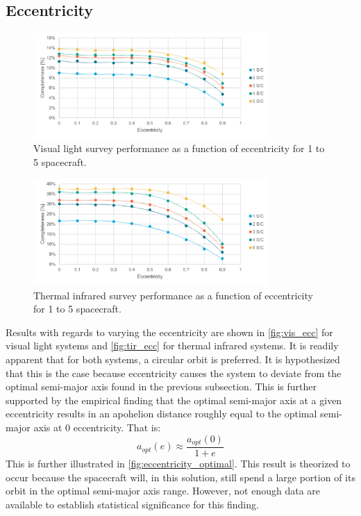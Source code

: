 \subsection{Eccentricity}
\begin{figure}[htbp]
 \centering
 \includegraphics[width=0.8\textwidth]{img/vis_ecc.pdf}
 \caption{Visual light survey performance as a function of eccentricity for 1 to 5 spacecraft.}
 \label{fig:vis_ecc}
\end{figure}

\begin{figure}[htbp]
 \centering
 \includegraphics[width=0.8\textwidth]{img/tir_ecc.pdf}
 \caption{Thermal infrared survey performance as a function of eccentricity for 1 to 5 spacecraft.}
 \label{fig:tir_ecc}
\end{figure}

Results with regards to varying the eccentricity are shown in \autoref{fig:vis_ecc} for visual light systems and \autoref{fig:tir_ecc} for thermal infrared systems. It is readily apparent that for both systems, a circular orbit is preferred. It is hypothesized that this is the case because eccentricity causes the system to deviate from the optimal semi-major axis found in the previous subsection. This is further supported by the empirical finding that the optimal semi-major axis at a given eccentricity results in an apohelion distance roughly equal to the optimal semi-major axis at 0 eccentricity. That is:
\begin{equation}
 a_{opt}(e) \approx \frac{a_{opt}(0)}{1+e}
\end{equation}
This is further illustrated in \autoref{fig:eccentricity_optimal}. This result is theorized to occur because the spacecraft will, in this solution, still spend a large portion of its orbit in the optimal semi-major axis range. However, not enough data are available to establish statistical significance for this finding.

